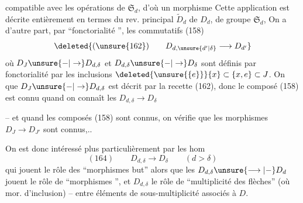 compatible avec les opérations de $\mathfrak S_d$, d'où un morphisme
 Cette application est décrite entièrement en termes du rev. principal $\widetilde D_d$ de $D_d$, de groupe $\mathfrak S_d$,  On a d'autre part, par ``fonctorialité '', les  commutatifs  (158)
\[
\deleted{(\unsure{162})\qquad D_{d,\unsure{d'|\delta}}\longrightarrow D_{d'}}
\]
où $D_J\unsure{-|\to}D_{d,\delta}$ et $D_{d,\delta}\unsure{-|\to}D_\delta$ sont définis par fonctorialité par les inclusions $\deleted{\unsure{\{e\}}}\{x\}\subset\{x,e\}\subset J$. On  que $D_J\unsure{-|\to}D_{d,\delta}$ est décrit par la recette (162), donc le composé (158) est connu quand on connaît les $D_{d,\delta}\longrightarrow D_\delta$

-- et quand les composés (158) sont connus, on vérifie que les morphismes $D_J\longrightarrow D_{J'}$ sont connus,..

On est donc intéressé plus particulièrement par les hom
\[
(164)\qquad D_{d,\delta}\longrightarrow D_\delta\qquad(d>\delta)
\]
qui jouent le rôle des ``morphismes but'' alors que les $D_{d,\delta}\unsure{\longrightarrow|-}D_d$ jouent le rôle de ``morphismes '', et $D_{d,\delta}$ le rôle de ``multiplicité des flèches'' (où mor. d'inclusion) -- entre éléments de sous-multiplicité  associés à $D$.

